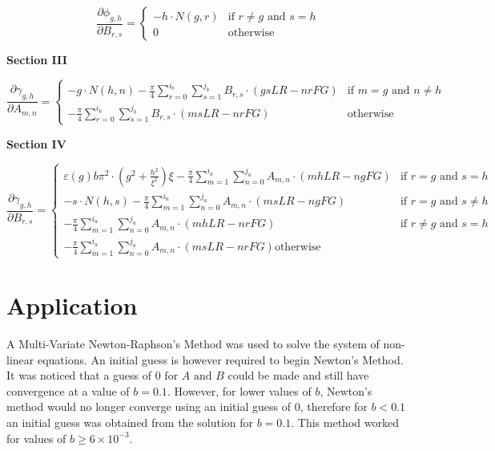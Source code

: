 \documentclass{article}
\newcommand{\pderiv}[2]{\frac{\partial #1}{\partial #2}} %
\newcommand{\spbox}[1]{ \text{ #1 }} %
\newcommand{\cfunc}[5]{
    #1 = 
    \begin{cases} 
        #2 & #3 \\
        #4 & #5
    \end{cases}
}
\begin{document}
\begin{equation} \label{4.11)} 
    \cfunc{\pderiv{\phi_{g,h}}{B_{r,s}}}
    {-h \cdot N\left(g,r\right)}{\text{if } r \ne g \spbox{and} s = h}
    {0}{\text{otherwise}}
\end{equation}

\textbf{Section III}

\begin{equation} \label{4.12)} 
    \cfunc{\pderiv{\gamma_{g,h}}{A_{m,n}}}
    {-g \cdot N\left(h,n\right) 
        - \frac{\pi}{4} \sum _{r=0}^{i_{b} } \sum _{s=1}^{j_{b}} B_{r,s} 
        \cdot \left(gsLR - nrFG\right)} 
    {\text{if } m = g \spbox{and} n \ne h}
    {-\frac{\pi }{4} \sum _{r=0}^{i_{b} } \sum _{s=1}^{j_{b}} B_{r,s} 
        \cdot \left(msLR - nrFG\right)} 
    {\text{otherwise}}
\end{equation}

\textbf{Section IV}

\begin{equation} \label{4.13)} 
    \pderiv{\gamma_{g,h}}{B_{r,s}} = 
    \begin{cases} 
    \varepsilon \left(g\right)b\pi ^{2} 
            \cdot \left(g^{2} + \frac{h^{2} }{\xi ^{2} } \right) \xi 
            - \frac{\pi }{4} \sum _{m=1}^{i_{a} } \sum _{n=0}^{j_{a} } A_{m,n} 
            \cdot \left(mhLR-ngFG\right)   
    & \text{if } r = g \spbox{and} s = h \\ 
     -s \cdot N\left(h, s\right) - \frac{\pi }{4} \sum _{m=1}^{i_{a} } \sum _{n=0}^{j_{a} }A_{m,n}
            \cdot \left(msLR - ngFG\right)
    & \text{if } r = g \spbox{and} s \ne h \\
     -\frac{\pi }{4} \sum _{m=1}^{i_{a} } \sum _{n=0}^{j_{a}} A_{m,n} 
            \cdot \left(mhLR - nrFG\right)
    & \text{if } r \ne g \spbox{and} s = h \\ 
     -\frac{\pi }{4} \sum _{m=1}^{i_{a} } \sum _{n=0}^{j_{a}} A_{m,n} 
            \cdot \left(msLR - nrFG\right)
    \text{otherwise} \end{cases}
\end{equation} 


\section{Application}

A Multi-Variate Newton-Raphson's Method was used to solve the system of
non-linear equations. An initial guess is however required to begin Newton's
Method. It was noticed that a guess of $0\spbox{for} A\spbox{and} B$ could be made and
still have convergence at a value of $b=0.1$. However, for lower values of $b$,
Newton's method would no longer converge using an initial guess of $0$,
therefore for $b<0.1$ an initial guess was obtained from the solution for
$b=0.1$. This method worked for values of $b\ge 6\times 10^{-3} $.
\end{document}
